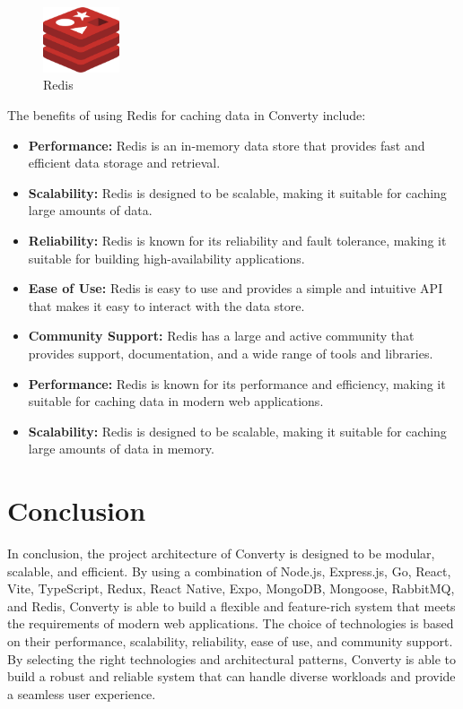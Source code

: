 \begin{figure}[H]
    \centering
    \includegraphics[width=0.2\textwidth]{Images/redis.png}
    \caption{Redis}
    \label{fig:redis}
\end{figure}

The benefits of using Redis for caching data in Converty include:

\begin{itemize}
    \item \textbf{Performance:} Redis is an in-memory data store that provides fast and efficient data storage and retrieval.
    \item \textbf{Scalability:} Redis is designed to be scalable, making it suitable for caching large amounts of data.
    \item \textbf{Reliability:} Redis is known for its reliability and fault tolerance, making it suitable for building high-availability applications.
    \item \textbf{Ease of Use:} Redis is easy to use and provides a simple and intuitive API that makes it easy to interact with the data store.
    \item \textbf{Community Support:} Redis has a large and active community that provides support, documentation, and a wide range of tools and libraries.
    \item \textbf{Performance:} Redis is known for its performance and efficiency, making it suitable for caching data in modern web applications.
    \item \textbf{Scalability:} Redis is designed to be scalable, making it suitable for caching large amounts of data in memory.
\end{itemize}

\section{Conclusion}

In conclusion, the project architecture of Converty is designed to be modular, scalable, and efficient. By using a combination of Node.js, Express.js, Go, React, Vite, TypeScript, Redux, React Native, Expo, MongoDB, Mongoose, RabbitMQ, and Redis, Converty is able to build a flexible and feature-rich system that meets the requirements of modern web applications. The choice of technologies is based on their performance, scalability, reliability, ease of use, and community support. By selecting the right technologies and architectural patterns, Converty is able to build a robust and reliable system that can handle diverse workloads and provide a seamless user experience.